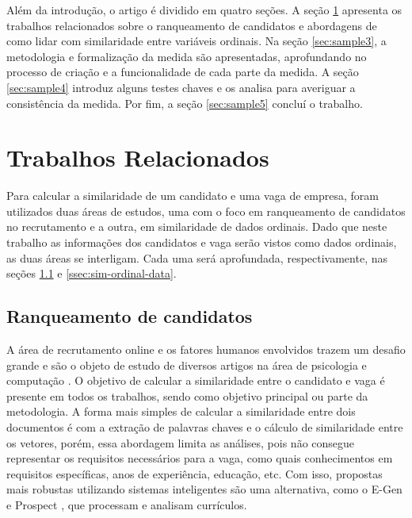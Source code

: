 \documentclass[preprint,12pt]{elsarticle}
\begin{document}
Além da introdução, o artigo é dividido em quatro seções. A seção \ref{sec:sample2} apresenta os trabalhos relacionados sobre o ranqueamento de candidatos e abordagens de como lidar com similaridade entre variáveis ordinais. Na seção \ref{sec:sample3}, a metodologia e formalização da medida são apresentadas, aprofundando no processo de criação e a funcionalidade de cada parte da medida. A seção \ref{sec:sample4} introduz alguns testes chaves e os analisa para averiguar a consistência da medida. Por fim, a seção \ref{sec:sample5} concluí o trabalho.

\section{Trabalhos Relacionados}
\label{sec:sample2}

Para calcular a similaridade de um candidato e uma vaga de empresa, foram utilizados duas áreas de estudos, uma com o foco em ranqueamento de candidatos no recrutamento e a outra, em similaridade de dados ordinais. Dado que neste trabalho as informações dos candidatos e vaga serão vistos como dados ordinais, as duas áreas se interligam. Cada uma será aprofundada, respectivamente, nas seções \ref{ssec:sim-candidate-company} e \ref{ssec:sim-ordinal-data}. 

\subsection{Ranqueamento de candidatos}
\label{ssec:sim-candidate-company}

A área de recrutamento online e os fatores humanos envolvidos trazem um desafio grande e são o objeto de estudo de diversos artigos na área de psicologia \cite{Chapman2005ApplicantAT, Hunter1990IndividualDI, Steel1984ARA} e computação \cite{poch-etal-2014-ranking, Singh2010PROSPECTAS, improve-ranking-candidates-2009, e-gen-job-processing-2007, impact-semantic-web-2005, automatic-profiling-2008}. O objetivo de calcular a similaridade entre o candidato e vaga é presente em todos os trabalhos, sendo como objetivo principal ou parte da metodologia. A forma mais simples de calcular a similaridade entre dois documentos é com a extração de palavras chaves e o cálculo de similaridade entre os vetores, porém, essa abordagem limita as análises, pois não consegue representar os requisitos necessários para a vaga, como quais conhecimentos em requisitos específicas, anos de experiência, educação, etc. Com isso, propostas mais robustas utilizando sistemas inteligentes são uma alternativa, como o E-Gen \cite{e-gen-job-processing-2007} e Prospect \cite{Singh2010PROSPECTAS}, que processam e analisam currículos. 
 
\end{document}
